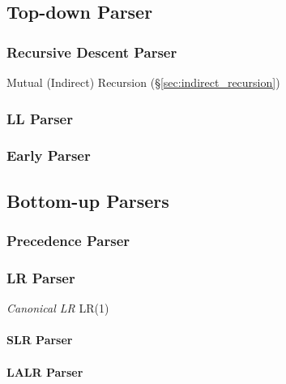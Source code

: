 \subsection{Top-down Parser}\label{sec:topdown_parser}

\subsubsection{Recursive Descent Parser}\label{sec:recursive_descent}

Mutual (Indirect) Recursion (\S\ref{sec:indirect_recursion})



\subsubsection{LL Parser}\label{sec:ll_parser}

\subsubsection{Early Parser}\label{sec:early_parser}



\subsection{Bottom-up Parsers}\label{sec:bottomup_parser}

\subsubsection{Precedence Parser}\label{sec:precedence_parser}

\subsubsection{LR Parser}\label{sec:lr_parser}

\emph{Canonical LR} LR(1)

\paragraph{SLR Parser}\label{sec:slr_parser}\hfill

\paragraph{LALR Parser}\label{sec:lalr_parser}\hfill


